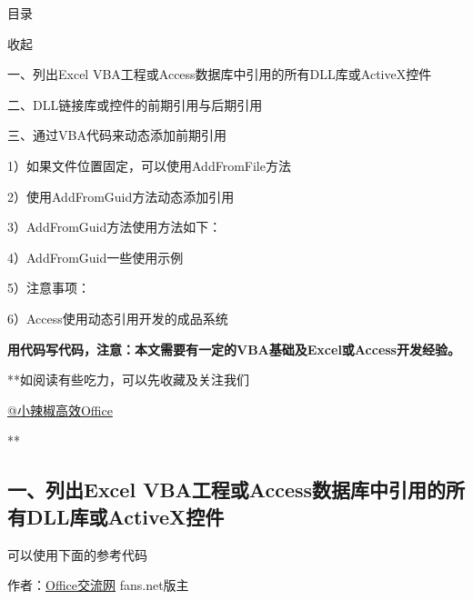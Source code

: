 \documentclass[
]{article}
\author{}
\date{}
\begin{document}
目录

收起

一、列出Excel VBA工程或Access数据库中引用的所有DLL库或ActiveX控件

二、DLL链接库或控件的前期引用与后期引用

三、通过VBA代码来动态添加前期引用

1）如果文件位置固定，可以使用AddFromFile方法

2）使用AddFromGuid方法动态添加引用

3）AddFromGuid方法使用方法如下：

4）AddFromGuid一些使用示例

5）注意事项：

6）Access使用动态引用开发的成品系统

\textbf{用代码写代码，注意：本文需要有一定的VBA基础及Excel或Access开发经验。}

**如阅读有些吃力，可以先收藏及关注我们

\href{//www.zhihu.com/people/61181a729ad96882fd24553e3f54ac6f}{@小辣椒高效Office}

**

\subsection{一、列出Excel
VBA工程或Access数据库中引用的所有DLL库或ActiveX控件}\label{ux4e00ux5217ux51faexcel-vbaux5de5ux7a0bux6216accessux6570ux636eux5e93ux4e2dux5f15ux7528ux7684ux6240ux6709dllux5e93ux6216activexux63a7ux4ef6}

可以使用下面的参考代码

作者：\href{https://link.zhihu.com/?target=http\%3A//www.office-cn.net/thread-38113-1-1.html}{Office交流网}
fans.net版主
\end{document}
